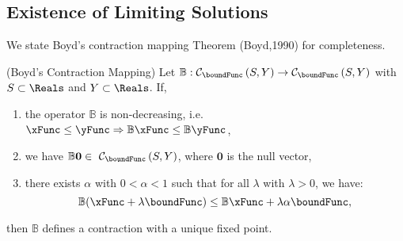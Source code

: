 \documentclass[\econtexRoot/BufferStockTheory]{subfiles}
\begin{document}
\hypertarget{It-Is-A-Contraction-Mapping}{}
\subsection{Existence of Limiting Solutions}\label{sec:Tcontractionmapping}



We state Boyd's contraction mapping Theorem (Boyd,1990) for completeness.

\begin{theorem}(Boyd's Contraction Mapping)\label{thm:Boyd}
Let $\mathbb{B}:\mathcal{C}_{\boundFunc }\left( S,Y\right)
  \rightarrow \mathcal{C}_{\boundFunc }\left(S,Y\right) $ with $S\subset \Reals$ and $Y\subset \Reals$. 
If, 
\begin{enumerate}
  \item the operator $\mathbb{B}$ is non-decreasing, i.e.\ $\xFunc \leq \yFunc \Rightarrow\mathbb{B}{\xFunc } \leq \mathbb{B}{\yFunc}$,
  \item we have $\mathbb{B}\mathbf{0}\in ~ \mathcal{C}_{\boundFunc }\left(S,Y\right) $, where $\mathbf{0}$ is the null vector,
  \item there exists $\alpha$ with $0 < \alpha < 1$ such that for all $\lambda$ with $\lambda > 0$, we have:
             $$\mathbb{B}({\xFunc } +\lambda\boundFunc ) \leq \mathbb{B}{\xFunc } +\lambda\alpha \boundFunc,$$
\end{enumerate}
then $\mathbb{B}$ defines a contraction with a unique fixed point.
\end{theorem}
\end{document}

